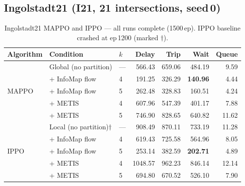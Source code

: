 \documentclass{article}
\begin{document}
\subsection{Ingolstadt21 (I21, 21 intersections, seed\,0)}
\label{app:results:i21}

\begin{table}[H]
\centering
\caption{Ingolstadt21 MAPPO and IPPO --- all runs complete (1500\,ep).
    IPPO baseline crashed at ep\,1200 (marked $\dagger$).}
\label{tab:i21_mappo_ippo}
\small
\begin{tabular}{lllrrrr}
\toprule
Algorithm & Condition & $k$ & Delay & Trip & Wait & Queue \\
\midrule
\multirow{5}{*}{MAPPO}
& Global (no partition) & --- &  566.43 & 659.06 & 484.19 &  9.59 \\
& + InfoMap flow        & 4   &  191.25 & 326.29 & \textbf{140.96} &  4.44 \\
& + InfoMap flow        & 5   &  262.48 & 328.83 & 160.51 &  4.24 \\
& + METIS               & 4   &  607.96 & 547.39 & 401.17 &  7.88 \\
& + METIS               & 5   &  746.90 & 828.65 & 640.82 & 11.62 \\
\midrule
\multirow{5}{*}{IPPO}
& Local (no partition)$\dagger$ & --- & 908.49 & 870.11 & 733.19 & 11.28 \\
& + InfoMap flow        & 4   &  619.43 & 725.58 & 564.96 &  8.05 \\
& + InfoMap flow        & 5   &  253.14 & 382.59 & \textbf{202.71} &  4.89 \\
& + METIS               & 4   & 1048.57 & 962.23 & 846.14 & 12.14 \\
& + METIS               & 5   &  694.80 & 670.52 & 526.10 &  7.90 \\
\bottomrule
\end{tabular}
\end{table}
\end{document}
